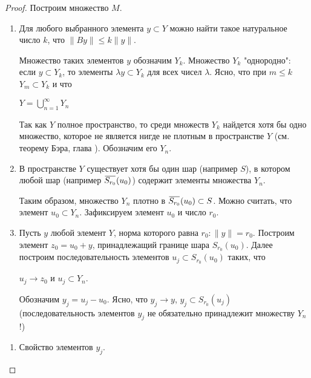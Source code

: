 \documentclass[12pt,a4paper,titlepage, oneside]{book}
\newcommand{\overbar}[1]{\mkern 1.5mu\overline{\mkern-1.5mu#1\mkern-1.5mu}\mkern 1.5mu}
\theoremstyle{definition}
\theoremstyle{plain}
\theoremstyle{remark}
\theoremstyle{remark}
\theoremstyle{remark}
\theoremstyle{plain}
\theoremstyle{plain}
\begin{document}
\begin{proof}
	
Построим множество $M$.

\begin{enumerate}
	\item Для любого выбранного элемента $y \subset Y$ можно найти такое натуральное число $k$, что $\lVert By\rVert \leq k\lVert y\rVert$.
	
	Множество таких элементов $y$ обозначим $Y_k$. Множество $Y_k$ "однородно": если $y \subset Y_k$, то элементы $\lambda y \subset Y_k$ для всех чисел $\lambda$. Ясно, что при $m \leq k$ $Y_m \subset Y_k$ и что

\begin{center}	

	$Y=\bigcup\limits_{n=1}^\infty Y_n$
	
\end{center}
	
	Так как $Y$ полное пространство, то среди множеств $Y_k$ найдется хотя бы одно множество, которое не является нигде не плотным в пространстве $Y$ (см. теорему Бэра, глава \uppercase\expandafter{}). Обозначим его $Y_n$.
	
	\item В пространстве $Y$ существует хотя бы один шар (например $S$), в котором любой шар (например $\overbar{S_{r_0}}(u_0)$) содержит элементы множества $Y_n$.
	
	Таким образом, множество $Y_n$ плотно в $\overbar{S_{r_0}}(u_0)\subset S$. Можно считать, что элемент $u_0 \subset Y_n$. Зафиксируем элемент $u_0$ и число $r_0$.
	
	\item Пусть $y$ любой элемент $Y$, норма которого равна $r_0:\lVert y\rVert=r_0$. Построим элемент $z_0=u_0+y$, принадлежащий границе шара $S_{r_0}(u_0)$. Далее построим последовательность элементов $u_j \subset S_{r_0}(u_0)$ таких, что

\begin{center}	

	$u_j \to z_0$ и $u_j \subset Y_n$.
	
\end{center}

Обозначим $y_j=u_j-u_0$. Ясно, что $y_j \to y$, $y_j \subset S_{r_0}(u_j)$ (последовательность элементов $y_j$ не обязательно принадлежит множеству $Y_n$!)
	
\end{enumerate}


\begin{enumerate}
\item Свойство элементов $y_j$.


\end{enumerate}
\end{proof}
\end{document}
